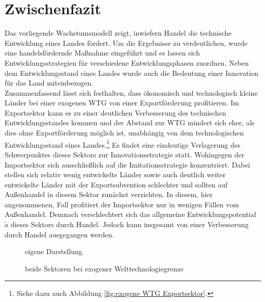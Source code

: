 \section{Zwischenfazit}
Das vorliegende Wachstumsmodell zeigt, inwiefern  Handel die technische Entwicklung eines Landes fördert. Um die Ergebnisse zu verdeutlichen, wurde eine handelsfördernde Maßnahme eingeführt und es lassen sich Entwicklungsstrategien für verschiedene Entwicklungsphasen zuordnen. Neben dem Entwicklungsstand eines Landes wurde auch die Bedeutung einer Innovation für das Land miteinbezogen.\\
Zusammenfassend lässt sich festhalten, dass ökonomisch und technologisch kleine Länder bei einer exogenen WTG von einer Exportförderung profitieren. Im Exportsektor kann es zu einer deutlichen Verbesserung des technischen Entwicklungsstandes kommen und der Abstand zur WTG mindert sich eher, als dies ohne Exportförderung möglich ist, unabhängig von dem technologischen Entwicklungsstand eines Landes.\footnote{Siehe dazu auch Abbildung \ref{fig:exogene WTG Exportsektor}.} Es findet eine eindeutige Verlagerung des Schwerpunktes dieses Sektors zur Innovationsstrategie statt. Wohingegen der Importsektor sich ausschließlich auf die Imitationsstrategie konzentriert. Dabei stellen sich relativ wenig entwickelte Länder sowie auch deutlich weiter entwickelte Länder mit der Exportsubvention schlechter und sollten auf Außenhandel in diesem Sektor zunächst verzichten. In diesem, hier angenommenen, Fall profitiert der Importsektor nur in wenigen Fällen vom Außenhandel. Demnach verschlechtert sich das allgemeine Entwicklungspotential $\tilde{a}$ dieses Sektors durch Handel. Jedoch kann insgesamt von einer Verbesserung durch Handel ausgegangen werden.\\
%
	\begin{figure}[h!] 
		\hfill{}  eigene Darstellung
		\caption{beide Sektoren bei exogener Welttechnologiegrenze}
		\label{fig:beide Sektor exogene WTG}
	\end{figure}
